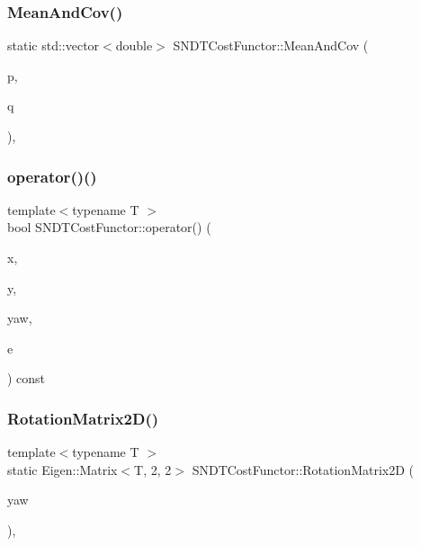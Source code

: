 \subsubsection{\texorpdfstring{Mean\+And\+Cov()}{MeanAndCov()}}
{\footnotesize\ttfamily static std\+::vector$<$double$>$ S\+N\+D\+T\+Cost\+Functor\+::\+Mean\+And\+Cov (\begin{DoxyParamCaption}\item[{const \hyperlink{classSNDTCell}{S\+N\+D\+T\+Cell} $\ast$}]{p,  }\item[{const \hyperlink{classSNDTCell}{S\+N\+D\+T\+Cell} $\ast$}]{q }\end{DoxyParamCaption})\hspace{0.3cm}{\ttfamily [inline]}, {\ttfamily [static]}}

\mbox{\label{structSNDTCostFunctor_aa90d5ea666b39220dc48e0474172268b}} 
\subsubsection{\texorpdfstring{operator()()}{operator()()}}
{\footnotesize\ttfamily template$<$typename T $>$ \\
bool S\+N\+D\+T\+Cost\+Functor\+::operator() (\begin{DoxyParamCaption}\item[{const T $\ast$const}]{x,  }\item[{const T $\ast$const}]{y,  }\item[{const T $\ast$const}]{yaw,  }\item[{T $\ast$}]{e }\end{DoxyParamCaption}) const\hspace{0.3cm}{\ttfamily [inline]}}

\mbox{\label{structSNDTCostFunctor_ac3ec5d55425287082f5ce7f1788715c7}} 
\subsubsection{\texorpdfstring{Rotation\+Matrix2\+D()}{RotationMatrix2D()}}
{\footnotesize\ttfamily template$<$typename T $>$ \\
static Eigen\+::\+Matrix$<$T, 2, 2$>$ S\+N\+D\+T\+Cost\+Functor\+::\+Rotation\+Matrix2D (\begin{DoxyParamCaption}\item[{T}]{yaw }\end{DoxyParamCaption})\hspace{0.3cm}{\ttfamily [inline]}, {\ttfamily [static]}}

